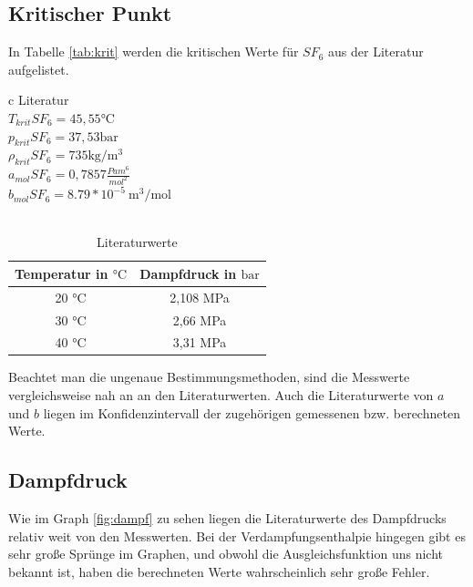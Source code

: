 \documentclass[11pt, a4paper]{article}
\begin{document}
    \subsection{Kritischer Punkt}
    In Tabelle \ref{tab:krit} werden die kritischen Werte für $SF_6$ aus der Literatur aufgelistet.
    \begin{table}[H]
        \centering
        \begin{tabular}{c}
            Literatur \\ \hline
            $T_{krit} SF_6 = 45,55 \si{\celsius}$ \cite{SH6} \\
            $p_{krit} SF_6 = 37,53 \si{\bar}$ \cite{SH6} \\
            $\rho_{krit} SF_6 = 735 \si{\kilogram \per \meter \cubed}$ \cite{SH6} \\
            $a_{mol} SF_6= 0,7857 \frac{Pa m^6}{mol^2}$ \cite{Theo}\\
            $b_{mol} SF_6= 8.79*10^{-5}~\si{\cubic\metre\per\mol}$\cite{Theo}\\
            \\
            \begin{tabular}{c c}
                Temperatur in $\si{\celsius}$ & Dampfdruck in $\si{\bar}$ \\ \hline
                20 \si{\celsius} & 2,108 \si{\mega\pascal} \\
                30 \si{\celsius} & 2,66 \si{\mega\pascal} \\
                40 \si{\celsius} & 3,31 \si{\mega\pascal} \\
            \end{tabular}
        \end{tabular}
        \caption{Literaturwerte}
        \label{tab:literaturwerte}
    \end{table}
    Beachtet man die ungenaue Bestimmungsmethoden, sind die Messwerte vergleichsweise nah an an den Literaturwerten. 
    Auch die Literaturwerte von $a$ und $b$ liegen im Konfidenzintervall der zugehörigen gemessenen bzw. berechneten Werte. 

    \subsection{Dampfdruck}
    Wie im Graph \ref{fig:dampf} zu sehen liegen die Literaturwerte des Dampfdrucks relativ weit von den Messwerten.
    Bei der Verdampfungsenthalpie hingegen gibt es sehr große Sprünge im Graphen, und obwohl die Ausgleichsfunktion
    uns nicht bekannt ist, haben die berechneten Werte wahrscheinlich sehr große Fehler. 
\end{document}

